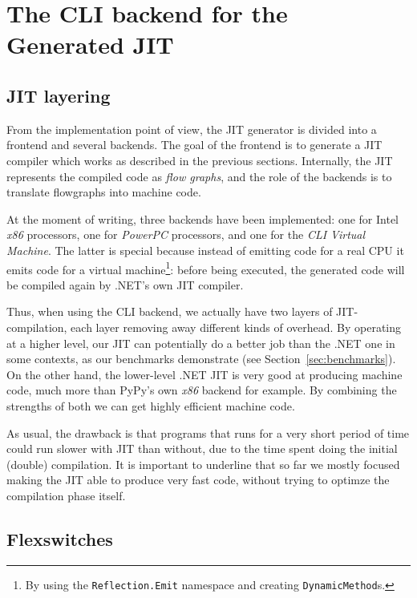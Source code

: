 \section{The CLI backend for the Generated JIT}
\label{sec:clibackend}

\subsection{JIT layering}

From the implementation point of view, the JIT generator is divided into a
frontend and several backends.  The goal of the frontend is to generate a JIT
compiler which works as described in the previous sections.  Internally, the
JIT represents the compiled code as \emph{flow graphs}, and the role of
the backends is to translate flowgraphs into machine code.

At the moment of writing, three backends have been implemented: one for Intel
\emph{x86} processors, one for \emph{PowerPC} processors, and one for the
\emph{CLI Virtual Machine}.  The latter is special because instead of emitting
code for a real CPU it emits code for a virtual machine\footnote{By using the 
\lstinline{Reflection.Emit} namespace and creating \lstinline{DynamicMethod}s.}: 
before being
executed, the generated code will be compiled again by .NET's own JIT
compiler.

Thus, when using the CLI backend, we actually have two layers of
JIT-compilation, each layer removing away different kinds of overhead.  By
operating at a higher level, our JIT can potentially do a better job than the
.NET one in some contexts, as our benchmarks demonstrate (see
Section~\ref{sec:benchmarks}).  On the other hand, the lower-level .NET JIT is
very good at producing machine code, much more than PyPy's own \emph{x86}
backend for example.  By combining the strengths of both we can get highly
efficient machine code.

As usual, the drawback is that programs that runs for a very short period of
time could run slower with JIT than without, due to the time spent doing the
initial (double) compilation.  It is important to underline that so far we
mostly focused making the JIT able to produce very fast code, without trying
to optimze the compilation phase itself.

\subsection{Flexswitches}

